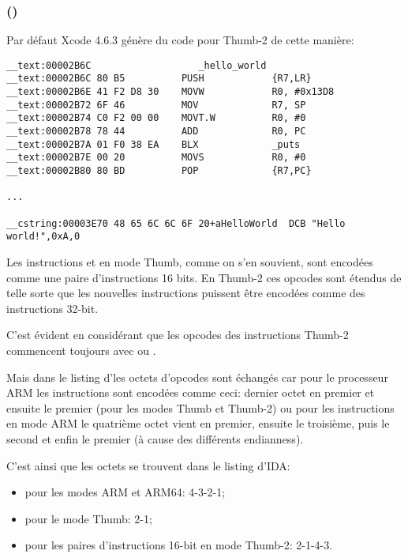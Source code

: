 \subsubsection{\OptimizingXcodeIV (\ThumbTwoMode)}

Par défaut Xcode 4.6.3 génère du code pour Thumb-2 de cette manière:

\begin{lstlisting}[caption=\OptimizingXcodeIV (\ThumbTwoMode),style=customasmARM]
__text:00002B6C                   _hello_world
__text:00002B6C 80 B5          PUSH            {R7,LR}
__text:00002B6E 41 F2 D8 30    MOVW            R0, #0x13D8
__text:00002B72 6F 46          MOV             R7, SP
__text:00002B74 C0 F2 00 00    MOVT.W          R0, #0
__text:00002B78 78 44          ADD             R0, PC
__text:00002B7A 01 F0 38 EA    BLX             _puts
__text:00002B7E 00 20          MOVS            R0, #0
__text:00002B80 80 BD          POP             {R7,PC}

...

__cstring:00003E70 48 65 6C 6C 6F 20+aHelloWorld  DCB "Hello world!",0xA,0
\end{lstlisting}


\myindex{\ThumbTwoMode}

Les instructions  et  en mode Thumb, comme on s'en souvient, sont
encodées comme une paire d'instructions 16 bits.
En Thumb-2 ces opcodes  sont étendus de telle sorte que les nouvelles
instructions puissent être encodées comme des instructions 32-bit.

C'est évident en considérant que les opcodes des instructions Thumb-2 commencent
toujours avec  ou .

Mais dans le listing d'\IDA les octets d'opcodes sont échangés car pour le processeur
ARM les instructions sont encodées comme ceci:
dernier octet en premier et ensuite le premier (pour les modes Thumb et Thumb-2)
ou pour les instructions en mode ARM le quatrième octet vient en premier, ensuite
le troisième, puis le second et enfin le premier (à cause des différents \gls{endianness}).

C'est ainsi que les octets se trouvent dans le listing d'IDA:
\begin{itemize}
\item pour les modes ARM et ARM64: 4-3-2-1;
\item pour le mode Thumb: 2-1;
\item pour les paires d'instructions 16-bit en mode Thumb-2: 2-1-4-3.
\end{itemize}


